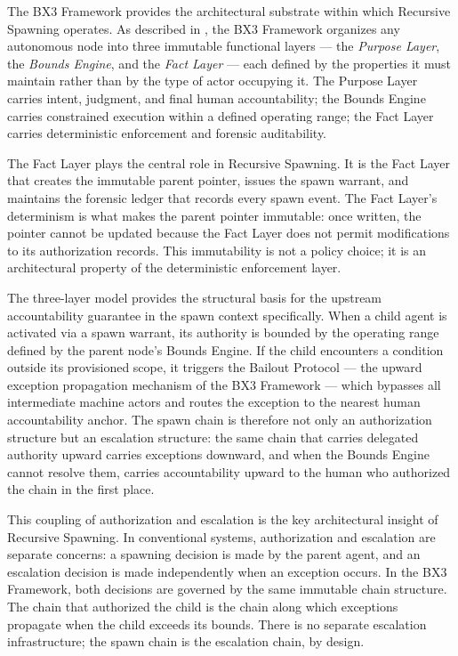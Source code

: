 The BX3 Framework provides the architectural substrate within which Recursive Spawning operates. As described in \cite{bx3framework2026}, the BX3 Framework organizes any autonomous node into three immutable functional layers — the \textit{Purpose Layer}, the \textit{Bounds Engine}, and the \textit{Fact Layer} — each defined by the properties it must maintain rather than by the type of actor occupying it. The Purpose Layer carries intent, judgment, and final human accountability; the Bounds Engine carries constrained execution within a defined operating range; the Fact Layer carries deterministic enforcement and forensic auditability.

The Fact Layer plays the central role in Recursive Spawning. It is the Fact Layer that creates the immutable parent pointer, issues the spawn warrant, and maintains the forensic ledger that records every spawn event. The Fact Layer's determinism is what makes the parent pointer immutable: once written, the pointer cannot be updated because the Fact Layer does not permit modifications to its authorization records. This immutability is not a policy choice; it is an architectural property of the deterministic enforcement layer.

The three-layer model provides the structural basis for the upstream accountability guarantee in the spawn context specifically. When a child agent is activated via a spawn warrant, its authority is bounded by the operating range defined by the parent node's Bounds Engine. If the child encounters a condition outside its provisioned scope, it triggers the Bailout Protocol \cite{bailoutprotocol2026} — the upward exception propagation mechanism of the BX3 Framework — which bypasses all intermediate machine actors and routes the exception to the nearest human accountability anchor. The spawn chain is therefore not only an authorization structure but an escalation structure: the same chain that carries delegated authority upward carries exceptions downward, and when the Bounds Engine cannot resolve them, carries accountability upward to the human who authorized the chain in the first place.

This coupling of authorization and escalation is the key architectural insight of Recursive Spawning. In conventional systems, authorization and escalation are separate concerns: a spawning decision is made by the parent agent, and an escalation decision is made independently when an exception occurs. In the BX3 Framework, both decisions are governed by the same immutable chain structure. The chain that authorized the child is the chain along which exceptions propagate when the child exceeds its bounds. There is no separate escalation infrastructure; the spawn chain is the escalation chain, by design.

